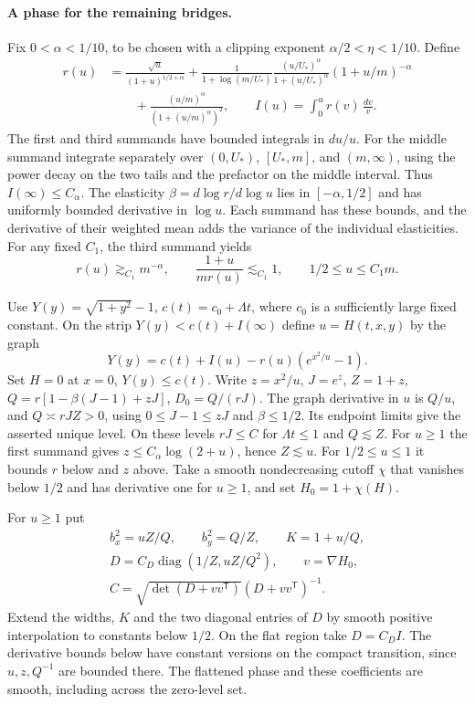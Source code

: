 \documentclass[11pt]{article}
\newcommand{\1}{\mathbf{1}}
\numberwithin{equation}{section}
\newcommand{\diag}{\operatorname{diag}}
\begin{document}
\paragraph{A phase for the remaining bridges.}
Fix \(0<\alpha<1/10\), to be chosen with a clipping exponent
\(\alpha/2<\eta<1/10\). Define
\begin{align*}
 r(u)&=\frac{\sqrt u}{(1+u)^{1/2+\alpha}}
 +\frac{1}{1+\log(m/U_*)}
   \frac{(u/U_*)^\alpha}{1+(u/U_*)^\alpha}(1+u/m)^{-\alpha}\\
 &\qquad+\frac{(u/m)^\alpha}{(1+(u/m)^\alpha)^2},
 \qquad I(u)=\int_0^u r(v)\,\frac{dv}{v}.
\end{align*}
The first and third summands have bounded integrals in \(du/u\).
For the middle summand integrate separately over
\((0,U_*)\), \([U_*,m]\), and \((m,\infty)\), using the
power decay on the two tails and the prefactor on the middle
interval. Thus \(I(\infty)\le C_\alpha\). The elasticity
\(\beta=d\log r/d\log u\) lies in \([-\alpha,1/2]\)
and has uniformly bounded derivative in \(\log u\).
Each summand has these bounds, and the derivative of their
weighted mean adds the variance of the individual elasticities.
For any fixed \(C_1\), the third summand yields
\begin{equation}\label{eq:sc-backup-floor}
 r(u)\gtrsim_{C_1}m^{-\alpha},\qquad
 \frac{1+u}{mr(u)}\lesssim_{C_1}1,\qquad 1/2\le u\le C_1m .
\end{equation}

Use \(Y(y)=\sqrt{1+y^2}-1\), \(c(t)=c_0+\Lambda t\),
where \(c_0\) is a sufficiently large fixed constant.
On the strip \(Y(y)<c(t)+I(\infty)\) define \(u=H(t,x,y)\)
by the graph
\[
 Y(y)=c(t)+I(u)-r(u)(e^{x^2/u}-1).
\]
Set \(H=0\) at \(x=0\), \(Y(y)\le c(t)\).
Write \(z=x^2/u\), \(J=e^z\), \(Z=1+z\),
\(Q=r[1-\beta(J-1)+zJ]\), \(D_0=Q/(rJ)\).
The graph derivative in \(u\) is \(Q/u\), and
\(Q\asymp rJZ>0\), using \(0\le J-1\le zJ\) and
\(\beta\le1/2\). Its endpoint limits give the asserted
unique level. On these levels \(rJ\le C\) for \(\Lambda t\le1\)
and \(Q\lesssim Z\). For \(u\ge1\) the first summand gives
\(z\le C_\alpha\log(2+u)\), hence \(Z\lesssim u\).
For \(1/2\le u\le1\) it bounds \(r\) below and \(z\) above.
Take a smooth nondecreasing cutoff \(\chi\) that vanishes
below \(1/2\) and has derivative one for \(u\ge1\),
and set \(H_0=1+\chi(H)\).

For \(u\ge1\) put
\begin{gather*}
 b_x^2=uZ/Q,\qquad b_y^2=Q/Z,\qquad K=1+u/Q,\\
 D=C_D\diag(1/Z,uZ/Q^2),\qquad v=\nabla H_0,\\
 C=\sqrt{\det(D+vv^{\mathsf T})}(D+vv^{\mathsf T})^{-1}.
\end{gather*}
Extend the widths, \(K\) and the two diagonal entries of \(D\)
by smooth positive interpolation to constants below \(1/2\).
On the flat region take \(D=C_D I\). The derivative bounds
below have constant versions on the compact transition, since
\(u,z,Q^{-1}\) are bounded there. The flattened phase and
these coefficients are smooth, including across the zero-level set.
\end{document}
